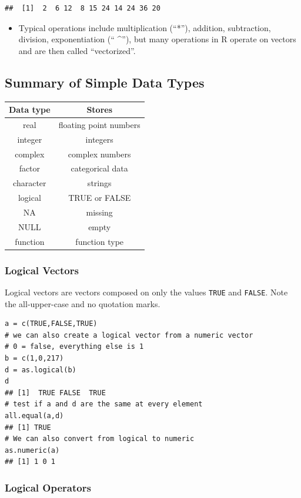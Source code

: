 \documentclass[]{article}
\providecommand{\tightlist}{%
  \setlength{\itemsep}{0pt}\setlength{\parskip}{0pt}}
\theoremstyle{definition}
\theoremstyle{definition}
\theoremstyle{remark}
\begin{document}
\begin{verbatim}
##  [1]  2  6 12  8 15 24 14 24 36 20
\end{verbatim}

\begin{itemize}
\tightlist
\item
  {Typical operations include multiplication (``*''), addition,
  subtraction, division, exponentiation (`` \^{}''), but many operations
  in R operate on vectors and are then called ``vectorized''.}
\end{itemize}

\subsection{Summary of Simple Data
Types}\label{summary-of-simple-data-types}

\begin{longtable}[]{@{}cc@{}}
\toprule
Data type & Stores\tabularnewline
\midrule
\endhead
real & floating point numbers\tabularnewline
integer & integers\tabularnewline
complex & complex numbers\tabularnewline
factor & categorical data\tabularnewline
character & strings\tabularnewline
logical & TRUE or FALSE\tabularnewline
NA & missing\tabularnewline
NULL & empty\tabularnewline
function & function type\tabularnewline
\bottomrule
\end{longtable}

\subsubsection{Logical Vectors}\label{logical-vectors}

Logical vectors are vectors composed on only the values \texttt{TRUE}
and \texttt{FALSE}. Note the all-upper-case and no quotation marks.

\begin{verbatim}
a = c(TRUE,FALSE,TRUE)
# we can also create a logical vector from a numeric vector
# 0 = false, everything else is 1
b = c(1,0,217)
d = as.logical(b)
d
## [1]  TRUE FALSE  TRUE
# test if a and d are the same at every element
all.equal(a,d)
## [1] TRUE
# We can also convert from logical to numeric
as.numeric(a)
## [1] 1 0 1
\end{verbatim}

\subsubsection{Logical Operators}\label{logical-operators}
\end{document}
